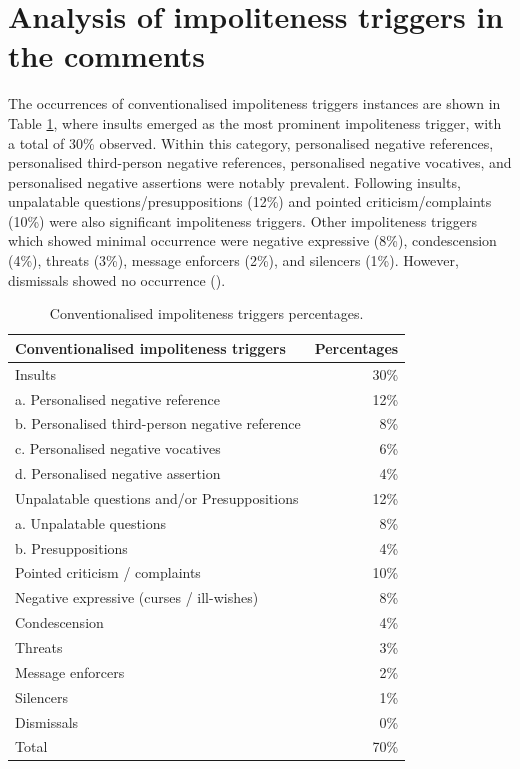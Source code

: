 \documentclass[english]{textolivre}
\begin{document}
\section{Analysis of impoliteness triggers in the comments}
The occurrences of conventionalised impoliteness triggers instances are shown in Table \ref{tab-1}, where insults emerged as the most prominent impoliteness trigger, with a total of 30\% observed. Within this category, personalised negative references, personalised third-person negative references, personalised negative vocatives, and personalised negative assertions were notably prevalent. Following insults, unpalatable questions/presuppositions (12\%) and pointed criticism/complaints (10\%) were also significant impoliteness triggers. Other impoliteness triggers which showed minimal occurrence were negative expressive (8\%), condescension (4\%), threats (3\%), message enforcers (2\%), and silencers (1\%). However, dismissals showed no occurrence ().

\begin{table}[h!]
\centering
\begin{threeparttable}
\caption{Conventionalised impoliteness triggers percentages.}\label{tab-1}
\begin{tabular}{lr}
\toprule
Conventionalised impoliteness triggers & \multicolumn{1}{c}{Percentages} \\
\midrule
Insults & 30\% \\
\quad a. Personalised negative reference & 12\% \\
\quad b. Personalised third-person negative reference & 8\% \\
\quad c. Personalised negative vocatives & 6\% \\
\quad d. Personalised negative assertion & 4\% \\
Unpalatable questions and/or Presuppositions & 12\% \\
\quad a. Unpalatable questions & 8\% \\
\quad b. Presuppositions & 4\% \\
Pointed criticism / complaints & 10\% \\
Negative expressive (curses / ill-wishes) & 8\% \\
Condescension & 4\% \\
Threats & 3\% \\
Message enforcers & 2\% \\
Silencers & 1\% \\
Dismissals & 0\% \\
[0.5em]
Total & 70\% \\
\bottomrule
\end{tabular}
\end{threeparttable}
\end{table}
\end{document}
